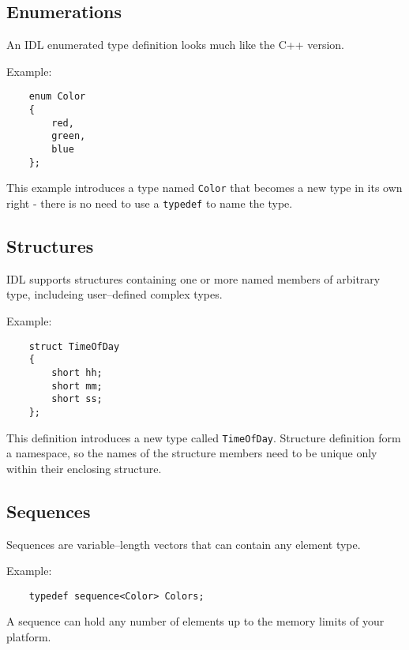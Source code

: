 \subsection{Enumerations}
An IDL enumerated type definition looks much like the C++ version.

Example:
\begin{verbatim}
    enum Color 
    {
        red, 
        green, 
        blue
    };
\end{verbatim}

This example introduces a type named {\tt Color} that becomes a new type in its
own right - there is no need to use a {\tt typedef} to name the type.


\subsection{Structures}
IDL supports structures containing one or more named members of arbitrary type,
includeing user--defined complex types.

Example:
\begin{verbatim}
    struct TimeOfDay
    {
        short hh;
        short mm;
        short ss;
    };
\end{verbatim}

This definition introduces a new type called {\tt TimeOfDay}.
Structure definition form a namespace, so the names of the structure members
need to be unique only within their enclosing structure.

\subsection{Sequences}
Sequences are variable--length vectors that can contain any element type. 

Example:
\begin{verbatim}
    typedef sequence<Color> Colors; 
\end{verbatim}

A sequence can hold any number of elements up to the memory limits of your
platform. 


